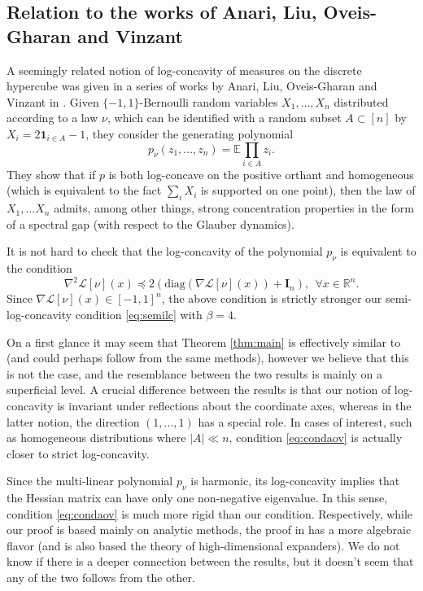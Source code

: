\documentclass[12pt]{article}
\def \RR {\mathbb R}
\def \EE {\mathbb E}
\def \Id {\mathbf{I}_n}
\theoremstyle{definition}
\theoremstyle{remark}
\begin{document}
\subsection{Relation to the works of Anari, Liu, Oveis-Gharan and Vinzant}
A seemingly related notion of log-concavity of measures on the discrete hypercube was given in a series of works by Anari, Liu, Oveis-Gharan and Vinzant in \cite{AOV2,AOV1}. Given $\{-1,1\}$-Bernoulli random variables $X_1,\dots,X_n$ distributed according to a law $\nu$, which can be identified with a random subset $A \subset [n]$ by $X_i = 2 \mathbf{1}_{i \in A} - 1$, they consider the generating polynomial
$$
p_\nu(z_1,...,z_n) = \EE \prod_{i \in A} z_i.
$$
They show that if $p$ is both log-concave on the positive orthant and homogeneous (which is equivalent to the fact $\sum_i X_i$ is supported on one point), then the law of $X_1,...X_n$ admits, among other things, strong concentration properties in the form of a spectral gap (with respect to the Glauber dynamics). 

It is not hard to check that the log-concavity of the polynomial $p_\nu$ is equivalent to the condition
\begin{equation}\label{eq:condaov}
\nabla^2 \mathcal{L}[\nu] (x) \preceq 2 \left (\mathrm{diag} \left (\nabla \mathcal{L}[\nu] (x) \right ) + \Id \right ), ~~ \forall x \in \RR^n.
\end{equation}
Since $\nabla \mathcal{L}[\nu] (x) \in [-1,1]^n$, the above condition is strictly stronger our semi-log-concavity condition \eqref{eq:semilc} with $\beta=4$. 

On a first glance it may seem that Theorem \ref{thm:main} is effectively similar to \cite[Theorem 1.1]{AOV2} (and could perhaps follow from the same methods), however we believe that this is not the case, and the resemblance between the two results is mainly on a superficial level. A crucial difference between the results is that our notion of log-concavity is invariant under reflections about the coordinate axes, whereas in the latter notion, the direction $(1,...,1)$ has a special role. In cases of interest, such as homogeneous distributions where $|A| \ll n$, condition \eqref{eq:condaov} is actually closer to strict log-concavity. 

Since the multi-linear polynomial $p_\nu$ is harmonic, its log-concavity implies that the Hessian matrix can have only one non-negative eigenvalue. In this sense, condition \eqref{eq:condaov} is much more rigid than our condition. Respectively, while our proof is based mainly on analytic methods, the proof in \cite{AOV2} has a more algebraic flavor (and is also based the theory of high-dimensional expanders). We do not know if there is a deeper connection between the results, but it doesn't seem that any of the two follows from the other. 
\end{document}
